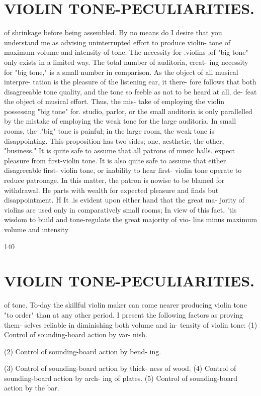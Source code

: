 \documentclass{article}
\begin{document}
\section*{VIOLIN TONE-PECULIARITIES.}
of shrinkage before being assembled. By no means do I desire that you understand me as advising uninterrupted effort to produce violin- tone of maximum volume and intensity of tone. The necessity for .violins ,of "big tone" only exists in a limited way. The total number of auditoria, creat- ing necessity for "big tone," is a small number in comparison. As the object of all musical interpre- tation is the pleasure of the listening ear, it there- fore follows that both disagreeable tone quality, and the tone so feeble as not to be heard at all, de- feat the object of musical effort. Thus, the mis- take of employing the violin possessing "big tone" for. studio, parlor, or the small auditoria is only parallelled by the mistake of employing the weak tone for the large auditoria. In small rooms, the ."big" tone is painful; in the large room, the weak tone is disappointing. This proposition has two sides; one, aesthetic, the other, "business." It is quite safe to assume that all patrons of music halls. expect pleasure from first-violin tone. It is also quite safe to assume that either disagreeable first- violin tone, or inability to hear first- violin tone operate to reduce patronage. In this matter, the patron is nowise to be blamed for withdrawal. He parts with wealth for expected pleasure and finds but disappointment. H It .is evident upon either hand that the great ma- jority of violins are used only in comparatively small rooms; In view of this fact, 'tis wisdom to build and tone-regulate the great majority of vio- lins minus maximum volume and intensity

140

\section*{VIOLIN TONE-PECULIARITIES.}
of tone. To-day the skillful violin maker can come nearer producing violin tone "to order" than at any other period. I present the following factors as proving them- selves reliable in diminishing both volume and in- tensity of violin tone: (1) Control of sounding-board action by var- nish.

(2) Control of sounding-board action by bend- ing.

(3) Control of sounding-board action by thick- ness of wood. (4) Control of sounding-board action by arch- ing of plates. (5) Control of sounding-board action by the bar.
\end{document}
